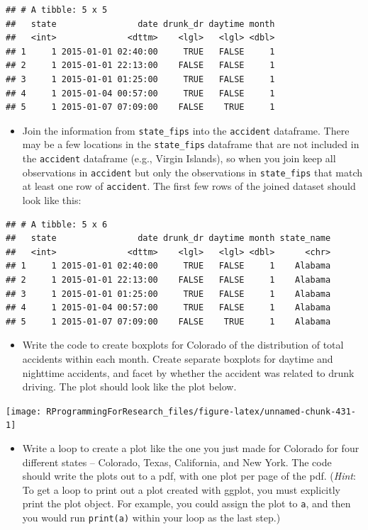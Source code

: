 \documentclass[]{book}
\providecommand{\tightlist}{%
  \setlength{\itemsep}{0pt}\setlength{\parskip}{0pt}}
\theoremstyle{definition}
\theoremstyle{definition}
\theoremstyle{definition}
\theoremstyle{remark}
\begin{document}
\begin{verbatim}
## # A tibble: 5 x 5
##   state                date drunk_dr daytime month
##   <int>              <dttm>    <lgl>   <lgl> <dbl>
## 1     1 2015-01-01 02:40:00     TRUE   FALSE     1
## 2     1 2015-01-01 22:13:00    FALSE   FALSE     1
## 3     1 2015-01-01 01:25:00     TRUE   FALSE     1
## 4     1 2015-01-04 00:57:00     TRUE   FALSE     1
## 5     1 2015-01-07 07:09:00    FALSE    TRUE     1
\end{verbatim}

\begin{itemize}
\tightlist
\item
  Join the information from \texttt{state\_fips} into the
  \texttt{accident} dataframe. There may be a few locations in the
  \texttt{state\_fips} dataframe that are not included in the
  \texttt{accident} dataframe (e.g., Virgin Islands), so when you join
  keep all observations in \texttt{accident} but only the observations
  in \texttt{state\_fips} that match at least one row of
  \texttt{accident}. The first few rows of the joined dataset should
  look like this:
\end{itemize}

\begin{verbatim}
## # A tibble: 5 x 6
##   state                date drunk_dr daytime month state_name
##   <int>              <dttm>    <lgl>   <lgl> <dbl>      <chr>
## 1     1 2015-01-01 02:40:00     TRUE   FALSE     1    Alabama
## 2     1 2015-01-01 22:13:00    FALSE   FALSE     1    Alabama
## 3     1 2015-01-01 01:25:00     TRUE   FALSE     1    Alabama
## 4     1 2015-01-04 00:57:00     TRUE   FALSE     1    Alabama
## 5     1 2015-01-07 07:09:00    FALSE    TRUE     1    Alabama
\end{verbatim}

\begin{itemize}
\tightlist
\item
  Write the code to create boxplots for Colorado of the distribution of
  total accidents within each month. Create separate boxplots for
  daytime and nighttime accidents, and facet by whether the accident was
  related to drunk driving. The plot should look like the plot below.
\end{itemize}

\begin{center}\texttt{[image: RProgrammingForResearch\_files/figure-latex/unnamed-chunk-431-1]} \end{center}

\begin{itemize}
\tightlist
\item
  Write a loop to create a plot like the one you just made for Colorado
  for four different states -- Colorado, Texas, California, and New
  York. The code should write the plots out to a pdf, with one plot per
  page of the pdf. (\emph{Hint}: To get a loop to print out a plot
  created with ggplot, you must explicitly print the plot object. For
  example, you could assign the plot to \texttt{a}, and then you would
  run \texttt{print(a)} within your loop as the last step.)
\end{itemize}
\end{document}
